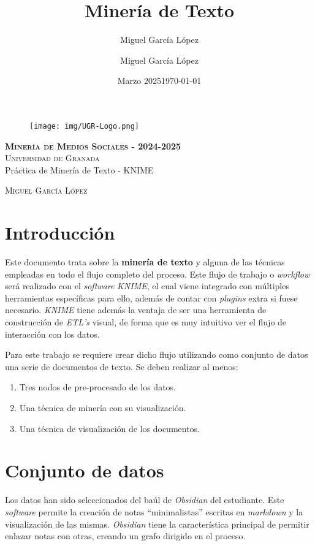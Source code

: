 \documentclass[12pt,letterpaper]{article}
\title{Minería de Texto}
\author{Miguel García López}
\date{Marzo 2025}
\author{Miguel García López} %
\date{\normalsize\today} %
\begin{document}
\begin{titlepage}
    \begin{figure}
        \vspace{-1.3cm}
        \begin{center}
            \texttt{[image: img/UGR-Logo.png]}
        \end{center}
    \end{figure}
    \vspace{1.3cm}
    \centering
    \normalfont \normalsize
    \textsc{\textbf{Minería de Medios Sociales - 2024-2025} \\\vspace{.15cm} Universidad de Granada} \\ [25pt]
    \huge Práctica de Minería de Texto - KNIME

    \normalfont \normalsize \vspace{.30cm}
    \textsc{Miguel García López}

\end{titlepage}

\tableofcontents
\listoffigures
\listoftables
\newpage

\section{Introducción}
Este documento trata sobre la \textbf{minería de texto} y alguna de las técnicas empleadas en todo el flujo completo del proceso. Este flujo de trabajo o \textit{workflow} será realizado con el \textit{software} \textit{KNIME}, el cual viene integrado con múltiples herramientas específicas para ello, además de contar con \textit{plugins} extra si fuese necesario. \textit{KNIME} tiene además la ventaja de ser una herramienta de construcción de \textit{ETL's} visual, de forma que es muy intuitivo ver el flujo de interacción con los datos.

Para este trabajo se requiere crear dicho flujo utilizando como conjunto de datos una serie de documentos de texto. Se deben realizar al menos:
\begin{enumerate}
    \item Tres nodos de pre-procesado de los datos.
    \item Una técnica de minería con su visualización.
    \item Una técnica de visualización de los documentos.
\end{enumerate}

\section{Conjunto de datos}
Los datos han sido seleccionados del baúl de \textit{Obsidian} del estudiante. Este \textit{software} permite la creación de notas ``minimalistas'' escritas en \textit{markdown} y la visualización de las mismas. \textit{Obsidian} tiene la característica principal de permitir enlazar notas con otras, creando un grafo dirigido en el proceso.
\end{document}
